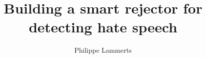 \documentclass[whitelogo]{tudelft-report}
\begin{document}
\frontmatter


\title[tudelft-white]{\nohyphens{Building a smart rejector for detecting hate speech}}
\author[tudelft-white]{Philippe Lammerts}
\makecover[split]








\tableofcontents

\mainmatter









\appendix

%


\end{document}
